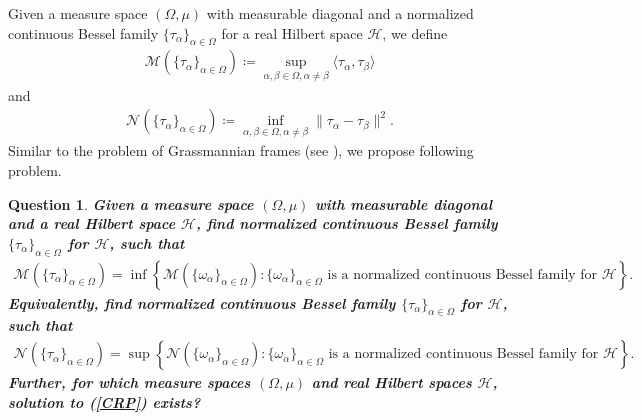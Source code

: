 \documentclass{amsart}
\newtheorem{question}[theorem]{Question}
\begin{document}
Given a   measure space  $(\Omega, \mu)$  with measurable diagonal and a 	normalized continuous Bessel  family $\{\tau_\alpha\}_{\alpha\in \Omega}$  for  a real Hilbert space $\mathcal{H}$, we define 
\begin{align*}
\mathcal{M}(\{\tau_\alpha\}_{\alpha\in \Omega})\coloneqq \sup _{\alpha, \beta \in \Omega, \alpha\neq \beta}\langle \tau_\alpha, \tau_\beta\rangle
\end{align*}
and 
\begin{align*}
\mathcal{N}(\{\tau_\alpha\}_{\alpha\in \Omega})\coloneqq	\inf _{\alpha, \beta \in \Omega, \alpha\neq \beta}\|\tau_\alpha-\tau_\beta\|^2.
\end{align*}
Similar to the problem of Grassmannian frames (see \cite{STROHMERHEATH}), we propose following problem.
\begin{question}
\textbf{Given a   measure space  $(\Omega, \mu)$  with measurable diagonal and a  real Hilbert space $\mathcal{H}$, find 		normalized continuous Bessel  family $\{\tau_\alpha\}_{\alpha\in \Omega}$  for   $\mathcal{H}$, such that 
\begin{align}\label{CRP}
\mathcal{M}(\{\tau_\alpha\}_{\alpha\in \Omega})	=\inf\left\{\mathcal{M}(\{\omega_\alpha\}_{\alpha\in \Omega}) : \{\omega_\alpha\}_{\alpha\in \Omega} \text{ is a normalized continuous Bessel  family for } \mathcal{H}\right\}. 
\end{align}
Equivalently, find 	normalized continuous Bessel  family $\{\tau_\alpha\}_{\alpha\in \Omega}$  for   $\mathcal{H}$, such that 
\begin{align*}
\mathcal{N}(\{\tau_\alpha\}_{\alpha\in \Omega})	=\sup\left\{\mathcal{N}(\{\omega_\alpha\}_{\alpha\in \Omega}) : \{\omega_\alpha\}_{\alpha\in \Omega} \text{ is a normalized continuous Bessel  family for } \mathcal{H}\right\}. 	
\end{align*}
Further, for which measure spaces  $(\Omega, \mu)$ and real Hilbert spaces $\mathcal{H}$, solution to (\ref{CRP}) exists?}
\end{question}
\end{document}
